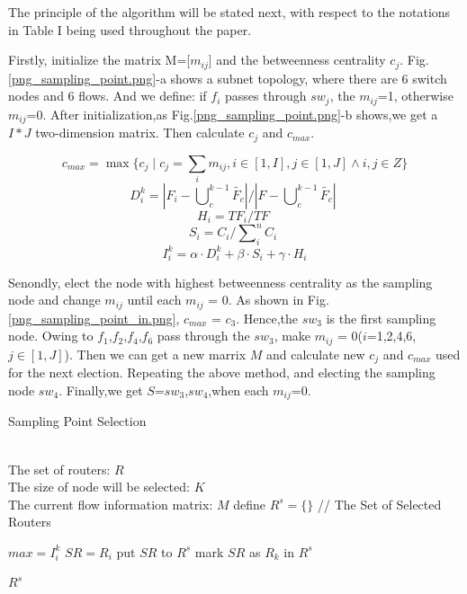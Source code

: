 \documentclass[conference,compsoc]{IEEEtran}
\begin{document}
The principle of the algorithm will be stated next, with respect to the notations in Table I being used throughout the paper.

Firstly, initialize the matrix M=[$m_{ij}$] and the betweenness centrality $c_j$. Fig.\ref{png_sampling_point.png}-a shows a subnet topology, where there are 6 switch nodes and 6 flows. And we define: if $f_i$ passes through $sw_j$, the $m_{ij}$=1, otherwise $m_{ij}$=0. After initialization,as Fig.\ref{png_sampling_point.png}-b shows,we get a $I \ast J$ two-dimension matrix. Then calculate $c_j$ and $c_{max}$.

\begin{equation}
 c_{max} = \max\{ c_j \mid c_j=\sum_i{m_{ij}},i\in[1,I],j\in[1,J] \wedge  i,j\in Z\} 
\end{equation}
\begin{equation}
D_{i}^{k}={\left| {{F}_{i}}-\bigcup\nolimits_{c}^{k-1}{\widetilde{{{F}_{c}}}} \right|}/{\left| F-\bigcup\nolimits_{c}^{k-1}{\widetilde{{{F}_{c}}}} \right|}\;
\end{equation}
\begin{equation}
{{H}_{i}}={T{{F}_{i}}}/{TF}\;
\end{equation}
\begin{equation}
{{S}_{i}}={{{C}_{i}}}/{\sum\nolimits_{i}^{n}{{{C}_{i}}}}\;
\end{equation}
\begin{equation}
I_{i}^{k}=\alpha \cdot D_{i}^{k}+\beta \cdot {{S}_{i}}+\gamma \cdot {{H}_{i}}
\end{equation}

Senondly, elect the node with highest betweenness centrality as the sampling node and change $m_{ij}$ until each $m_{ij}$ = 0. As shown in Fig.\ref{png_sampling_point_in.png}, $c_{max}$ = $c_3$. Hence,the $sw_3$ is the first sampling node. Owing to $f_1$,$f_2$,$f_4$,$f_6$ pass through the $sw_3$, make $m_{ij}$ = 0($i$=1,2,4,6,$j \in [1,J]$). Then we can get a new marrix $M$ and calculate new $c_j$ and $c_{max}$ used for the next election. Repeating the above method, and electing the sampling node $sw_4$. Finally,we get $S$={$sw_3$,$sw_4$},when each $m_{ij}$=0.  

\begin{algorithm}[h]
\caption{Sampling Point Selection}
\begin{algorithmic}[1]
\REQUIRE ~~\\ The set of routers: $ R$ \\  The size of node will be selected: $K$ \\ The current flow information matrix: $M$
\STATE define $R^s=\{\}$  //  The Set of Selected Routers


\STATE $max = I_i^k$
\STATE $SR = R_i$
\ENDIF
\ENDFOR
\STATE put $SR$ to $R^s$
\STATE mark $SR$ as $R_k$ in $R^s$
\ENDFOR

\RETURN $R^s$
\label{code:recentEnd}
\end{algorithmic}
\end{algorithm}
\end{document}
